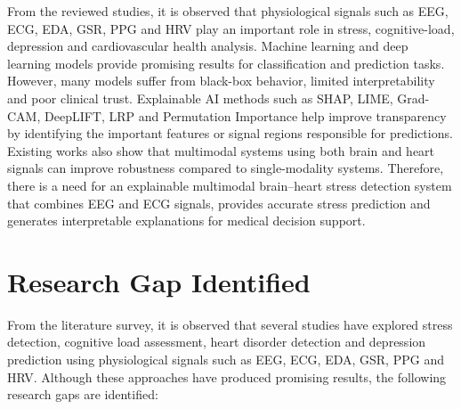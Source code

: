 \documentclass[12pt,a4paper]{report}
\begin{document}
From the reviewed studies, it is observed that physiological signals such as EEG, ECG, EDA, GSR, PPG and HRV play an important role in stress, cognitive-load, depression and cardiovascular health analysis. Machine learning and deep learning models provide promising results for classification and prediction tasks. However, many models suffer from black-box behavior, limited interpretability and poor clinical trust. Explainable AI methods such as SHAP, LIME, Grad-CAM, DeepLIFT, LRP and Permutation Importance help improve transparency by identifying the important features or signal regions responsible for predictions. Existing works also show that multimodal systems using both brain and heart signals can improve robustness compared to single-modality systems. Therefore, there is a need for an explainable multimodal brain--heart stress detection system that combines EEG and ECG signals, provides accurate stress prediction and generates interpretable explanations for medical decision support.

\endgroup

\chapter{Research Gap Identified}

From the literature survey, it is observed that several studies have explored stress detection, cognitive load assessment, heart disorder detection and depression prediction using physiological signals such as EEG, ECG, EDA, GSR, PPG and HRV. Although these approaches have produced promising results, the following research gaps are identified:
\end{document}
